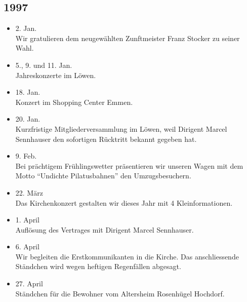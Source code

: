 \subsection{1997}

\begin{history}


    \begin{itemize}

        \item 2. Jan.\\
              Wir gratulieren dem neugewählten Zunftmeister Franz Stocker zu seiner
              Wahl.

        \item 5., 9. und 11. Jan.\\
              Jahreskonzerte im Löwen.

        \item 18. Jan.\\
              Konzert im Shopping Center Emmen.

        \item 20. Jan.\\
              Kurzfristige Mitgliederversammlung im Löwen, weil Dirigent Marcel
              Sennhauser den sofortigen Rücktritt bekannt gegeben hat.

        \item 9. Feb.\\
              Bei prächtigem Frühlingswetter präsentieren wir unseren Wagen mit dem
              Motto \enquote{Undichte Pilatusbahnen} den Umzugsbesuchern.

        \item 22. März\\
              Das Kirchenkonzert gestalten wir dieses Jahr mit 4 Kleinformationen.

        \item 1. April\\
              Auflösung des Vertrages mit Dirigent Marcel Sennhauser.

        \item 6. April\\
              Wir begleiten die Erstkommunikanten in die Kirche. Das anschliessende
              Ständchen wird wegen heftigen Regenfällen abgesagt.

        \item 27. April\\
              Ständchen für die Bewohner vom Altersheim Rosenhügel Hochdorf.


\end{itemize}
\end{history}
